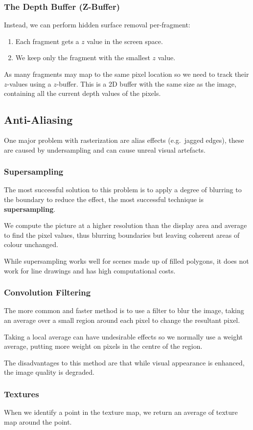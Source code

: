 \documentclass[11pt]{article}
\begin{document}
\subsubsection{The Depth Buffer (Z-Buffer)}
Instead, we can perform hidden surface removal per-fragment:
\begin{enumerate}
  \item Each fragment gets a $z$ value in the screen space.
  \item We keep only the fragment with the smallest $z$ value.
\end{enumerate}
As many fragments may map to the same pixel location so we need to track their $z$-values using a $z$-buffer.
This is a 2D buffer with the same size as the image, containing all the current depth values of the pixels.

\subsection{Anti-Aliasing}
One major problem with rasterization are alias effects (e.g.\ jagged edges), these are caused by undersampling and can cause unreal visual artefacts.


\subsubsection{Supersampling}
The most successful solution to this problem is to apply a degree of blurring to the boundary to reduce the effect, the most successful technique is \textbf{supersampling}.

We compute the picture at a higher resolution than the display area and average to find the pixel values, thus blurring boundaries but leaving coherent areas of colour unchanged.

While supersampling works well for scenes made up of filled polygons, it does not work for line drawings and has high computational costs.

\subsubsection{Convolution Filtering}
The more common and faster method is to use a filter to blur the image, taking an average over a small region around each pixel to change the resultant pixel.

Taking a local average can have undesirable effects so we normally use a weight average, putting more weight on pixels in the centre of the region.

The disadvantages to this method are that while visual appearance is enhanced, the image quality is degraded.

\subsubsection{Textures}
When we identify a point in the texture map, we return an average of texture map around the point.
\end{document}
